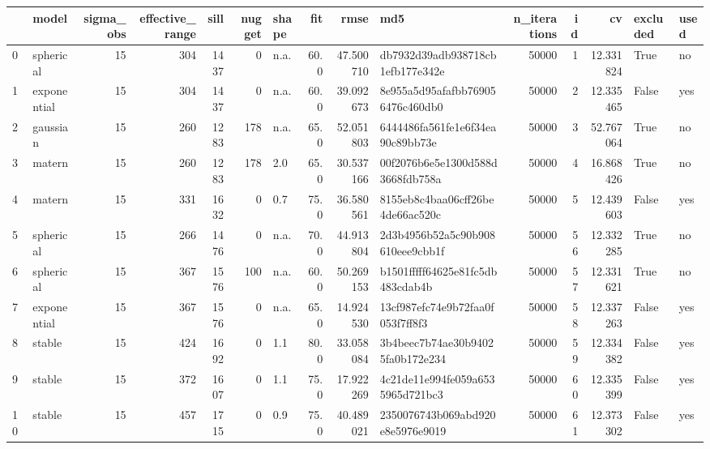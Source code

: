 \begin{tabular}{llrrrrlrrlrrrll}
\toprule
{} &        model &  sigma\_obs &  effective\_range &  sill &  nugget & shape &   fit &       rmse &                               md5 &  n\_iterations &  id &         cv &  excluded & used \\
\midrule
0  &    spherical &         15 &              304 &  1437 &       0 &  n.a. &  60.0 &  47.500710 &  db7932d39adb938718cb1efb177e342e &         50000 &   1 &  12.331824 &      True &   no \\
1  &  exponential &         15 &              304 &  1437 &       0 &  n.a. &  60.0 &  39.092673 &  8e955a5d95afafbb769056476c460db0 &         50000 &   2 &  12.335465 &     False &  yes \\
2  &     gaussian &         15 &              260 &  1283 &     178 &  n.a. &  65.0 &  52.051803 &  6444486fa561fe1e6f34ea90c89bb73e &         50000 &   3 &  52.767064 &      True &   no \\
3  &       matern &         15 &              260 &  1283 &     178 &   2.0 &  65.0 &  30.537166 &  00f2076b6e5e1300d588d3668fdb758a &         50000 &   4 &  16.868426 &      True &   no \\
4  &       matern &         15 &              331 &  1632 &       0 &   0.7 &  75.0 &  36.580561 &  8155eb8c4baa06cff26be4de66ac520c &         50000 &   5 &  12.439603 &     False &  yes \\
5  &    spherical &         15 &              266 &  1476 &       0 &  n.a. &  70.0 &  44.913804 &  2d3b4956b52a5c90b908610eee9cbb1f &         50000 &  56 &  12.332285 &      True &   no \\
6  &    spherical &         15 &              367 &  1576 &     100 &  n.a. &  60.0 &  50.269153 &  b1501fffff64625e81fc5db483cdab4b &         50000 &  57 &  12.331621 &      True &   no \\
7  &  exponential &         15 &              367 &  1576 &       0 &  n.a. &  65.0 &  14.924530 &  13cf987efc74e9b72faa0f053f7ff8f3 &         50000 &  58 &  12.337263 &     False &  yes \\
8  &       stable &         15 &              424 &  1692 &       0 &   1.1 &  80.0 &  33.058084 &  3b4beec7b74ae30b94025fa0b172e234 &         50000 &  59 &  12.334382 &     False &  yes \\
9  &       stable &         15 &              372 &  1607 &       0 &   1.1 &  75.0 &  17.922269 &  4c21de11e994fe059a6535965d721bc3 &         50000 &  60 &  12.335399 &     False &  yes \\
10 &       stable &         15 &              457 &  1715 &       0 &   0.9 &  75.0 &  40.489021 &  2350076743b069abd920e8e5976e9019 &         50000 &  61 &  12.373302 &     False &  yes \\
\bottomrule
\end{tabular}
